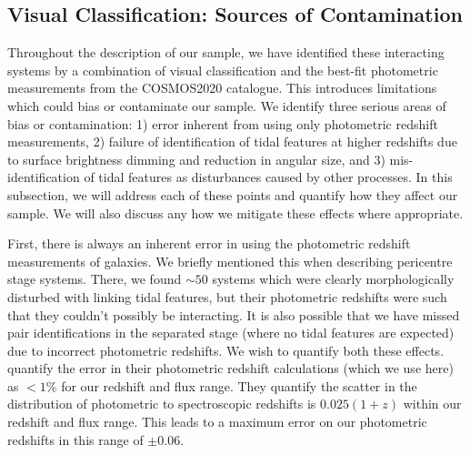 \subsection{Visual Classification: Sources of Contamination}
\noindent Throughout the description of our sample, we have identified these interacting systems by a combination of visual classification and the best-fit photometric measurements from the COSMOS2020 catalogue. This introduces limitations which could bias or contaminate our sample. We identify three serious areas of bias or contamination: 1) error inherent from using only photometric redshift measurements, 2) failure of identification of tidal features at higher redshifts due to surface brightness dimming and reduction in angular size, and 3) mis-identification of tidal features as disturbances caused by other processes. In this subsection, we will address each of these points and quantify how they affect our sample. We will also discuss any how we mitigate these effects where appropriate.

First, there is always an inherent error in using the photometric redshift measurements of galaxies. We briefly mentioned this when describing pericentre stage systems. There, we found $\sim50$ systems which were clearly morphologically disturbed with linking tidal features, but their photometric redshifts were such that they couldn't possibly be interacting. It is also possible that we have missed pair identifications in the separated stage (where no tidal features are expected) due to incorrect photometric redshifts. We wish to quantify both these effects. \citet{2022ApJS..258...11W} quantify the error in their photometric redshift calculations (which we use here) as $<1$\% for our redshift and flux range. They quantify the scatter in the distribution of photometric to spectroscopic redshifts is $0.025(1+z)$ within our redshift and flux range. This leads to a maximum error on our photometric redshifts in this range of $\pm0.06$. 

